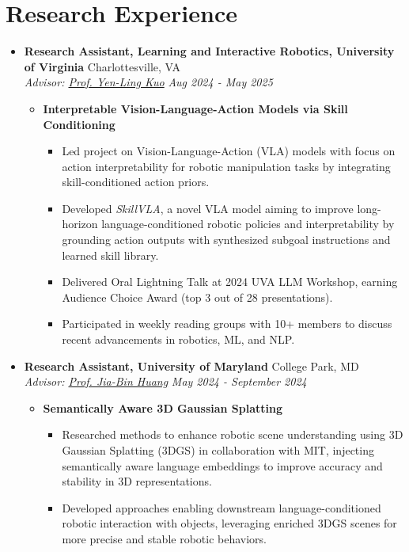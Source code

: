 \documentclass[letterpaper,11pt]{article}
\newcommand{\Date}[1]{\textit{\small #1}}
\newcommand{\heading}[4]{
  \textbf{#1} \hfill #2 \\
  \textit{\small#3} \hfill \Date{#4}
}
\begin{document}
\section{Research Experience}
\begin{itemize}[label={}, leftmargin=0pt]
  \item \heading{Research Assistant, Learning and Interactive Robotics, University of Virginia}{Charlottesville, VA}
        {Advisor: \href{https://yenlingkuo.com/}{Prof. Yen-Ling Kuo}}{Aug 2024 - May 2025}
        \begin{itemize}
          \item \textbf{Interpretable Vision-Language-Action Models via Skill Conditioning}
                \begin{itemize}
                  \item Led project on Vision-Language-Action (VLA) models with focus on action interpretability for robotic manipulation tasks by integrating skill-conditioned action priors.
                  \item Developed \textit{SkillVLA}, a novel VLA model aiming to improve long-horizon language-conditioned
                        robotic policies and interpretability by grounding action outputs with synthesized subgoal instructions and learned skill library.
                  \item Delivered Oral Lightning Talk at 2024 UVA LLM Workshop, earning Audience Choice Award (top 3 out of 28 presentations).
                  \item Participated in weekly reading groups with 10+ members to discuss recent advancements in robotics, ML, and NLP.
                \end{itemize}
        \end{itemize}
  \item \heading{Research Assistant, University of Maryland}{College Park, MD}
        {Advisor: \href{https://jbhuang0604.github.io/}{Prof. Jia-Bin Huang}}{May 2024 - September 2024}
        \begin{itemize}
          \item \textbf{Semantically Aware 3D Gaussian Splatting}
                \begin{itemize}
                  \item Researched methods to enhance robotic scene understanding using 3D Gaussian Splatting (3DGS) in collaboration with MIT, injecting semantically aware language embeddings to improve accuracy and stability in 3D representations.
                  \item Developed approaches enabling downstream language-conditioned robotic interaction with objects, leveraging enriched 3DGS scenes for more precise and stable robotic behaviors.

\end{itemize}
\end{itemize}
\end{itemize}
\end{document}
